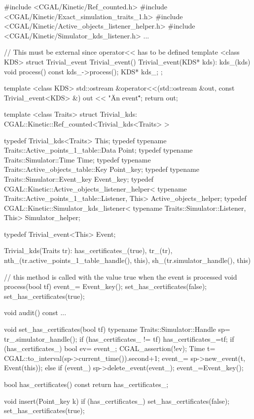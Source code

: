 \begin{ccExampleCode}
#include <CGAL/Kinetic/Ref_counted.h>
#include <CGAL/Kinetic/Exact_simulation_traits_1.h>
#include <CGAL/Kinetic/Active_objects_listener_helper.h>
#include <CGAL/Kinetic/Simulator_kds_listener.h>
...

// This must be external since operator<< has to be defined
template <class KDS>
struct Trivial_event
{
  Trivial_event(){}
  Trivial_event(KDS* kds): kds_(kds) {
  }
  void process() const
  {
    kds_->process();
  }
  KDS* kds_;
};

template <class KDS>
std::ostream &operator<<(std::ostream &out,
			 const Trivial_event<KDS> &) {
  out << "\"An event\"";
  return out;
}


template <class Traits>
struct Trivial_kds: CGAL::Kinetic::Ref_counted<Trivial_kds<Traits> >
{
  typedef Trivial_kds<Traits> This;
  typedef typename Traits::Active_points_1_table::Data Point;
  typedef typename Traits::Simulator::Time Time;
  typedef typename Traits::Active_objects_table::Key Point_key;
  typedef typename Traits::Simulator::Event_key Event_key;
  typedef CGAL::Kinetic::Active_objects_listener_helper<
    typename Traits::Active_points_1_table::Listener, This> Active_objects_helper;
  typedef CGAL::Kinetic::Simulator_kds_listener<
    typename Traits::Simulator::Listener, This> Simulator_helper;

  typedef Trivial_event<This> Event;

  Trivial_kds(Traits tr): has_certificates_(true),
			  tr_(tr),
			  nth_(tr.active_points_1_table_handle(), this),
			  sh_(tr.simulator_handle(), this){}

  // this method is called with the value true when the event is processed
  void process(bool tf) {
     event_= Event_key();
     set_has_certificates(false);
     set_has_certificates(true);
  }

  void audit() const
  {
     ...
  }

  void set_has_certificates(bool tf) {
    typename Traits::Simulator::Handle sp= tr_.simulator_handle();
    if (has_certificates_ != tf) {
      has_certificates_=tf;
      if (has_certificates_) {
	bool ev= event_;
	CGAL_assertion(!ev);
	Time t= CGAL::to_interval(sp->current_time()).second+1;
	event_= sp->new_event(t, Event(this));
      } else if (event_) {
	sp->delete_event(event_);
	event_=Event_key();
      }
    }
  }

  bool has_certificates() const {
    return has_certificates_;
  }

  void insert(Point_key k) {
    if (has_certificates_) {
      set_has_certificates(false);
      set_has_certificates(true);
    }
  }

}
\end{ccExampleCode}
